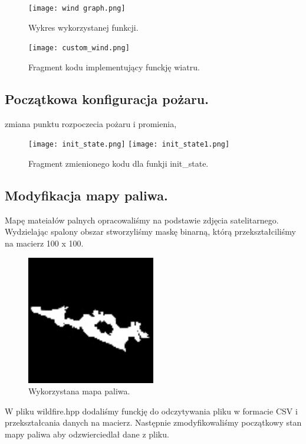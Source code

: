 \documentclass[onecolumn,12pt]{article}
\begin{document}
\begin{figure}[h]
    \centering
    \texttt{[image: wind graph.png]}
    \caption{Wykres wykorzystanej funkcji.}
    \label{fig:example}
\end{figure}

\begin{figure}[h]
    \centering
    \texttt{[image: custom\_wind.png]}
    \caption{Fragment kodu implementujący funckję wiatru.}
    \label{fig:example}
\end{figure}


\subsection{Początkowa konfiguracja pożaru.}
zmiana punktu rozpoczecia pożaru i promienia, 

\begin{figure}[H]
    \centering
    \texttt{[image: init\_state.png]}
    \texttt{[image: init\_state1.png]}
    \caption{Fragment zmienionego kodu dla funkji init_state.}
    \label{fig:example}
\end{figure}

\subsection{Modyfikacja mapy paliwa.}
Mapę mateiałów palnych opracowaliśmy na podstawie zdjęcia satelitarnego. Wydzielając spalony obszar stworzyliśmy maskę binarną, którą przekształciliśmy na macierz 100 x 100. 

\begin{figure}[H]
    \centering
    \includegraphics[width=0.5\textwidth]{project_wildfire/IMG_0896.png}
    \caption{Wykorzystana mapa paliwa.}
    \label{fig:example}
\end{figure}

W pliku wildfire.hpp dodaliśmy funckję do odczytywania pliku w formacie CSV i przekształcania danych na macierz. Następnie zmodyfikowaliśmy początkowy stan mapy paliwa aby odzwierciedlał dane z pliku.
\end{document}
